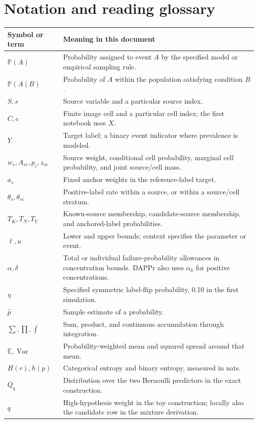 \documentclass[11pt,a4paper]{report}
\newcommand{\E}{\mathbb E}
\newcommand{\Prob}{\mathbb P}
\newcommand{\Var}{\operatorname{Var}}
\begin{document}
\chapter{Notation and reading glossary}
\begin{longtable}{p{}p{}}
\toprule Symbol or term & Meaning in this document\\\midrule\endhead
$\Prob(A)$ & Probability assigned to event $A$ by the specified model or empirical sampling rule.\\
$\Prob(A\mid B)$ & Probability of $A$ within the population satisfying condition $B$.\\
$S,s$ & Source variable and a particular source index.\\
$C,c$ & Finite image cell and a particular cell index; the first notebook uses $X$.\\
$Y$ & Target label; a binary event indicator where prevalence is modeled.\\
$w_s,A_{sc},p_c,z_{sc}$ & Source weight, conditional cell probability, marginal cell probability, and joint source/cell mass.\\
$a_s$ & Fixed anchor weights in the reference-label target.\\
$\theta_s,\theta_{sc}$ & Positive-label rate within a source, or within a source/cell stratum.\\
$T_K,T_N,T_Y$ & Known-source membership, candidate-source membership, and anchored-label probabilities.\\
$\ell,u$ & Lower and upper bounds; context specifies the parameter or event.\\
$\alpha,\delta$ & Total or individual failure-probability allowances in concentration bounds. DAPPr also uses $\alpha_k$ for positive concentrations.\\
$\eta$ & Specified symmetric label-flip probability, 0.10 in the first simulation.\\
$\widehat p$ & Sample estimate of a probability.\\
$\sum,\prod,\int$ & Sum, product, and continuous accumulation through integration.\\
$\E,\Var$ & Probability-weighted mean and squared spread around that mean.\\
$H(r),h(p)$ & Categorical entropy and binary entropy, measured in nats.\\
$Q_q$ & Distribution over the two Bernoulli predictors in the exact construction.\\
$q$ & High-hypothesis weight in the toy construction; locally also the candidate row in the mixture derivation.\\

\end{longtable}
\end{document}
